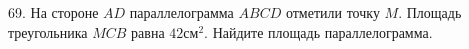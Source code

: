 69. На стороне $AD$ параллелограмма $ABCD$ отметили точку $M.$ Площадь треугольника $MCB$ равна $42\text{см}^2.$ Найдите площадь параллелограмма.\\
